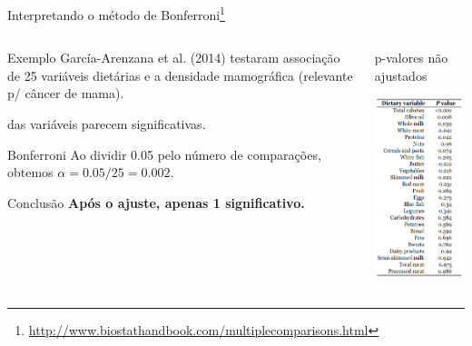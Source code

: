 \documentclass{beamer}
\begin{document}
\begin{frame}{\scriptsize Interpretando o método de Bonferroni\footnote{\tiny \url{http://www.biostathandbook.com/multiplecomparisons.html}}}
  \begin{columns}
    \begin{column}{6.5cm}
      \begin{exampleblock}{\footnotesize Exemplo}
        \scriptsize
        García-Arenzana et al. (2014) testaram associação de 25 variáveis dietárias e a densidade mamográfica (relevante p/ câncer de mama).

         das variáveis parecem significativas.
      \end{exampleblock}
      \medskip
      \begin{block}{\footnotesize Bonferroni}
        \scriptsize
        Ao dividir 0.05 pelo número de comparações, obtemos $\alpha = 0.05/25 = 0.002$.
      \end{block}
      \bigskip
      \bigskip
      \begin{block}{\footnotesize Conclusão}
        \footnotesize
        {\bf Após o ajuste, apenas 1 significativo.}
      \end{block}
    \end{column}
    \begin{column}{3.5cm}
      \begin{center}
        {\footnotesize p-valores não ajustados}

        \medskip
        \includegraphics[height=.8\textheight]{Cap13-30/ex-25-testes}
      \end{center}
    \end{column}
  \end{columns}
\end{frame}
\end{document}
